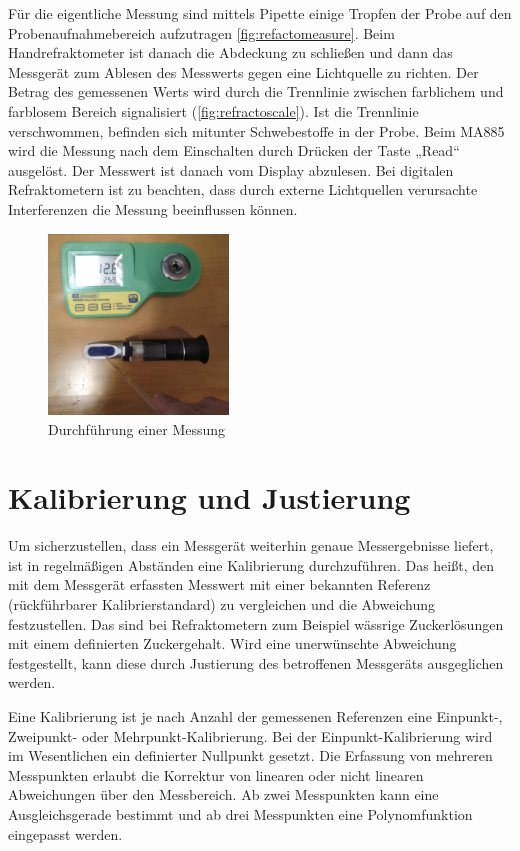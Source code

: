 \documentclass[a4paper,parskip=half]{scrartcl}
\begin{document}
Für die eigentliche Messung sind mittels Pipette einige Tropfen
der Probe auf den Probenaufnahmebereich aufzutragen
\autoref{fig:refactomeasure}. Beim Handrefraktometer
ist danach die Abdeckung zu schließen und dann das Messgerät
zum Ablesen des Messwerts gegen eine Lichtquelle zu richten.
Der Betrag des gemessenen Werts wird durch die Trennlinie zwischen
farblichem und farblosem Bereich signalisiert (\autoref{fig:refractoscale}).
Ist die Trennlinie verschwommen, befinden sich mitunter Schwebestoffe
in der Probe. Beim MA885 wird die Messung nach
dem Einschalten durch Drücken der Taste „Read“ ausgelöst. Der
Messwert ist danach vom Display abzulesen. Bei digitalen
Refraktometern ist zu beachten, dass durch externe Lichtquellen
verursachte Interferenzen die Messung beeinflussen können.
\autocite{Gossett2012a,Terrill2013}

\begin{figure}[h]
\centering
\includegraphics[width=4.8cm]{images/measure.jpg}
\caption{Durchführung einer Messung}
\label{fig:refactomeasure}
\end{figure}

\section*{Kalibrierung und Justierung}

Um sicherzustellen, dass ein Messgerät weiterhin genaue Messergebnisse
liefert, ist in regelmäßigen Abständen eine Kalibrierung durchzuführen.
Das heißt, den mit dem Messgerät erfassten Messwert mit einer bekannten
Referenz (rückführbarer Kalibrierstandard) zu vergleichen und die
Abweichung festzustellen. Das sind bei Refraktometern zum Beispiel
wässrige Zuckerlösungen mit einem definierten Zuckergehalt.
Wird eine unerwünschte Abweichung festgestellt, kann diese
durch Justierung des betroffenen Messgeräts ausgeglichen werden.

Eine Kalibrierung ist je nach Anzahl der gemessenen Referenzen
eine Einpunkt-, Zweipunkt- oder Mehrpunkt-Kalibrierung.
Bei der Einpunkt-Kalibrierung wird im Wesentlichen ein definierter
Nullpunkt gesetzt. Die Erfassung von mehreren Messpunkten erlaubt
die Korrektur von linearen oder nicht linearen Abweichungen
über den Messbereich. Ab zwei Messpunkten kann eine Ausgleichsgerade
bestimmt und ab drei Messpunkten eine Polynomfunktion eingepasst
werden. \autocite{Earl2015}
\end{document}
